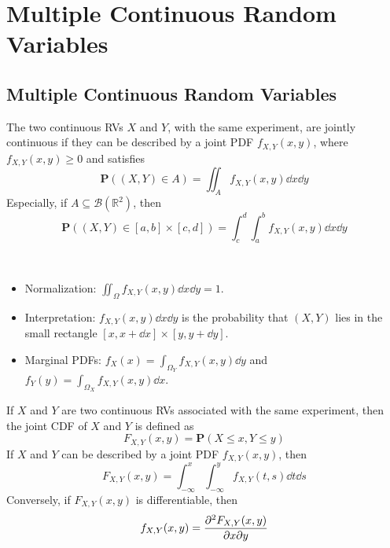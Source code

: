 \chapter{Multiple Continuous Random Variables}


\section{Multiple Continuous Random Variables}

\begin{definition}
    The two continuous RVs $X$ and $Y$, with the same experiment, are jointly continuous if they can be described by a joint PDF $f_{X, Y}(x, y)$, where $f_{X, Y}(x, y) \geq 0$ and satisfies
    \begin{equation}
        \mathbf{P}((X, Y) \in A) = \iint_{A} f_{X, Y}(x, y) \dd{x} \dd{y}
    \end{equation}
    Especially, if $A \subseteq \mathcal{B}(\mathbb{R}^2)$, then
    \begin{equation}
        \mathbf{P}((X, Y) \in [a, b] \times [c, d]) = \int_{c}^{d} \int_{a}^{b} f_{X, Y}(x, y) \dd{x} \dd{y}
    \end{equation}
\end{definition}

\begin{property} ~
    \begin{itemize}
        \item Normalization: $\iint_{\Omega} f_{X, Y}(x, y) \dd{x} \dd{y} = 1$.
        \item Interpretation: $f_{X, Y}(x, y) \dd{x} \dd{y}$ is the probability that $(X, Y)$ lies in the small rectangle $[x, x + \dd{x}] \times [y, y + \dd{y}]$.
        \item Marginal PDFs: $f_{X}(x) = \int_{\Omega_{Y}} f_{X, Y}(x, y) \dd{y}$ and $f_{Y}(y) = \int_{\Omega_{X}} f_{X, Y}(x, y) \dd{x}$.
    \end{itemize}
\end{property}

\begin{definition}
    If $X$ and $Y$ are two continuous RVs associated with the same experiment, then the joint CDF of $X$ and $Y$ is defined as
    \begin{equation}
        F_{X, Y}(x, y) = \mathbf{P}(X \leq x, Y \leq y)
    \end{equation}
    If $X$ and $Y$ can be described by a joint PDF $f_{X, Y}(x, y)$, then
    \begin{equation}
        F_{X, Y}(x, y) = \int_{-\infty}^{x} \int_{-\infty}^{y} f_{X, Y}(t, s) \dd{t} \dd{s}
    \end{equation}
    Conversely, if $F_{X, Y}(x, y)$ is differentiable, then
    \begin{equation}
        f_{X, Y}(x, y) = \pdv{F_{X, Y}(x, y)}{x}{y}
    \end{equation}
\end{definition}

